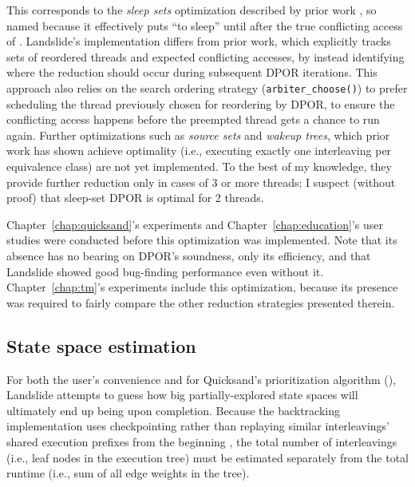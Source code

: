 This corresponds to the {\em sleep sets} optimization described by prior work \cite{partial-order-methods,dpor,optimal-dpor},
so named because it effectively puts 
``to sleep'' until after the true conflicting access of .
Landslide's implementation differs from prior work,
which explicitly tracks sets of reordered threads and expected conflicting accesses,
by instead identifying
where the reduction should occur
during subsequent DPOR iterations.
This approach also relies on the search ordering strategy ({\tt arbiter\_choose()})
to prefer scheduling the thread previously chosen for reordering by DPOR,
to ensure the conflicting access happens before the preempted thread gets a chance to run again.
Further optimizations such as {\em source sets} and {\em wakeup trees},
which prior work has shown achieve optimality
(i.e., executing exactly one interleaving per equivalence class) \cite{optimal-dpor}
are not yet implemented.
To the best of my knowledge,
they provide further reduction only in cases of 3 or more threads;
I suspect (without proof) that sleep-set DPOR is optimal for 2 threads.

Chapter~\ref{chap:quicksand}'s experiments and Chapter~\ref{chap:education}'s user studies
were conducted before this optimization was implemented.
Note that its absence has no bearing on DPOR's soundness, only its efficiency,
and that Landslide showed good bug-finding performance even without it.
Chapter~\ref{chap:tm}'s experiments include this optimization,
because its presence was required to fairly compare the other reduction strategies presented therein.


\subsection{State space estimation}
\label{sec:landslide-estimate}

For both the user's convenience and for Quicksand's prioritization algorithm (\sect{\ref{sec:quicksand-id}}),
Landslide attempts to guess how big partially-explored state spaces will ultimately end up being upon completion.
Because the backtracking implementation uses checkpointing
rather than replaying similar interleavings' shared execution prefixes from the beginning \sect{\ref{sec:landslide-timetravel}},
the total number of interleavings (i.e., leaf nodes in the execution tree)
must be estimated separately from the total runtime (i.e., sum of all edge weights in the tree).

